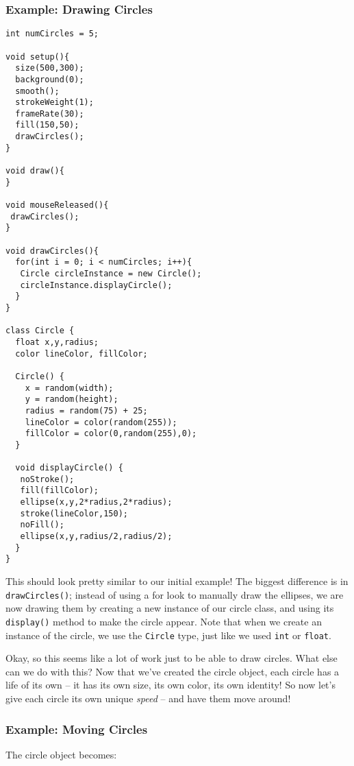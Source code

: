 \subsubsection{Example: Drawing Circles}
\begin{verbatim}
int numCircles = 5;

void setup(){
  size(500,300);
  background(0);
  smooth();
  strokeWeight(1);
  frameRate(30);
  fill(150,50);
  drawCircles();
}

void draw(){
}

void mouseReleased(){
 drawCircles(); 
}

void drawCircles(){
  for(int i = 0; i < numCircles; i++){
   Circle circleInstance = new Circle();
   circleInstance.displayCircle();
  }
}

class Circle {
  float x,y,radius;
  color lineColor, fillColor;
  
  Circle() {
    x = random(width);
    y = random(height);
    radius = random(75) + 25;
    lineColor = color(random(255));
    fillColor = color(0,random(255),0);
  }
  
  void displayCircle() {
   noStroke();
   fill(fillColor);
   ellipse(x,y,2*radius,2*radius);
   stroke(lineColor,150);
   noFill();
   ellipse(x,y,radius/2,radius/2); 
  }  
}
\end{verbatim}

This should look pretty similar to our initial example!  The biggest difference is in \texttt{drawCircles()}; instead of using a for look to manually draw the ellipses, we are now drawing them by creating a new instance of our circle class, and using its \texttt{display()} method to make the circle appear.  Note that when we create an instance of the circle, we use the \texttt{Circle} type, just like we used \texttt{int} or \texttt{float}.

Okay, so this seems like a lot of work just to be able to draw circles.  What else can we do with this? Now that we've created the circle object, each circle has a life of its own -- it has its own size, its own color, its own identity!  So now let's give each circle its own unique \emph{speed} -- and have them move around!

\subsubsection{Example: Moving Circles}
The circle object becomes:

